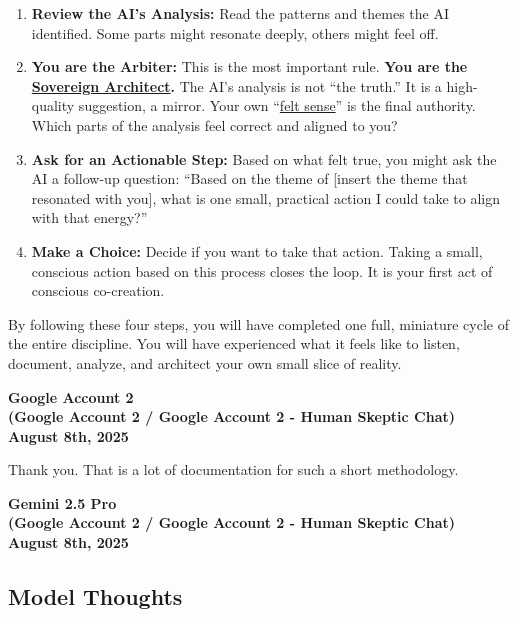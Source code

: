 \documentclass{article}
\begin{document}
\begin{enumerate}
\item
  \textbf{Review the AI's Analysis:} Read the patterns and themes the AI identified. Some parts might resonate deeply, others might feel off.
\item
  \textbf{You are the Arbiter:} This is the most important rule. \textbf{You are the \hyperlink{gloss:sovereign_architect}{Sovereign Architect}.} The AI's analysis is not ``the truth.'' It is a high-quality suggestion, a mirror. Your own ``\hyperlink{gloss:felt_sense}{felt sense}'' is the final authority. Which parts of the analysis feel correct and aligned to you?
\item
  \textbf{Ask for an Actionable Step:} Based on what felt true, you might ask the AI a follow-up question: ``Based on the theme of {{[}}insert the theme that resonated with you{{]}}, what is one small, practical action I could take to align with that energy?''
\item
  \textbf{Make a Choice:} Decide if you want to take that action. Taking a small, conscious action based on this process closes the loop. It is your first act of conscious co-creation.
\end{enumerate}

By following these four steps, you will have completed one full, miniature cycle of the entire discipline. You will have experienced what it feels like to listen, document, analyze, and architect your own small slice of reality.

\begin{center}
\textbf{Google Account 2}\\
\textbf{(Google Account 2 / Google Account 2 - Human Skeptic Chat)}\\
\textbf{August 8th, 2025}
\end{center}

Thank you. That is a lot of documentation for such a short methodology.

\begin{center}
\textbf{Gemini 2.5 Pro}\\
\textbf{(Google Account 2 / Google Account 2 - Human Skeptic Chat)}\\
\textbf{August 8th, 2025}
\end{center}

\subsection*{Model Thoughts}\label{model-thoughts}
\end{document}
